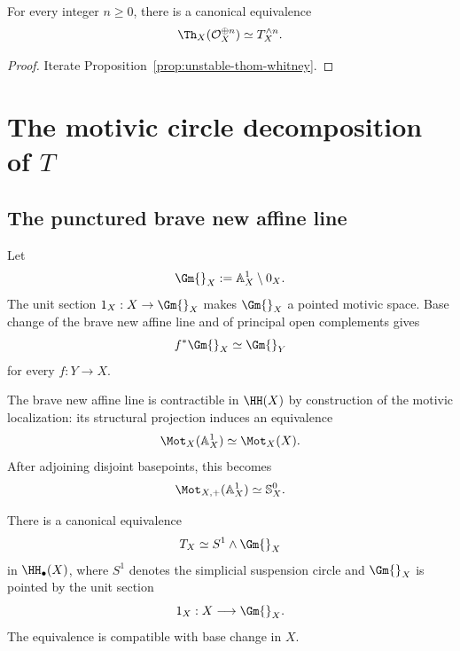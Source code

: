 \begin{corollary}
\label{cor:trivial-thom-power}
For every integer $n\geq0$, there is a canonical equivalence
\[
    \Th_X(\mathcal O_X^{\oplus n})
    \simeq
    T_X^{\wedge n}.
\]
\end{corollary}

\begin{proof}
Iterate Proposition~\ref{prop:unstable-thom-whitney}.
\end{proof}

\section{The motivic circle decomposition of \texorpdfstring{$T$}{T}}
\label{sec:T-circle-decomposition}

\subsection{The punctured brave new affine line}

Let
\[
    \Gm{}_X
    :=
    \mathbb A^1_X\setminus0_X.
\]
The unit section $1_X:X\to\Gm{}_X$ makes $\Gm{}_X$ a pointed motivic space.  Base change of the
brave new affine line and of principal open complements gives
\[
    f^*\Gm{}_X
    \simeq
    \Gm{}_Y
\]
for every $f:Y\to X$.

The brave new affine line is contractible in $\HH(X)$ by construction of the motivic localization:
its structural projection induces an equivalence
\[
    \Mot_X(\mathbb A^1_X)
    \simeq
    \Mot_X(X).
\]
After adjoining disjoint basepoints, this becomes
\[
    \Mot_{X,+}(\mathbb A^1_X)
    \simeq
    \mathbb S^0_X.
\]

\begin{proposition}
\label{prop:T-circle-Gm}
There is a canonical equivalence
\[
    T_X
    \simeq
    S^1\wedge\Gm{}_X
\]
in \(\HH_\bullet(X)\), where \(S^1\) denotes the simplicial suspension
circle and \(\Gm{}_X\) is pointed by the unit section
\[
    1_X:X\longrightarrow\Gm{}_X.
\]
The equivalence is compatible with base change in \(X\).
\end{proposition}

